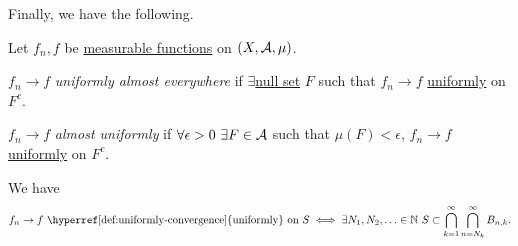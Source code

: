 Finally, we have the following.
\begin{definition*}
	Let \(f_{n}, f\) be \hyperref[def:measurable-function]{measurable functions} on \((X, \mathcal{\MakeUppercase{a}} , \mu )\).
	\begin{definition}\label{def:uniformly-almost-everywhere}
		\(f_{n}\to f\) \emph{uniformly almost everywhere} if \(\exists \)\hyperref[def:mu-null-set]{null set} \(F\) such that
		\(f_{n}\to f\) \hyperref[def:uniformly-convergence]{uniformly} on \(F^{c} \).
	\end{definition}
	\begin{definition}\label{def:almost-uniformly}
		\(f_{n}\to f\) \emph{almost uniformly} if \(\forall \epsilon >0\ \exists F\in \mathcal{\MakeUppercase{a}} \) such that
		\(\mu (F)<\epsilon \), \(f_{n}\to f\)  \hyperref[def:uniformly-convergence]{uniformly} on \(F^{c} \).
	\end{definition}
\end{definition*}

\begin{lemma}
	We have
	\[
		f_{n}\to f \text{ \hyperref[def:uniformly-convergence]{uniformly} on } S \iff \exists N_1, N_2, \ldots\in \mathbb{\MakeUppercase{n}}\ S\subset \bigcap\limits_{k=1}^{\infty} \bigcap\limits_{n=N_k}^{\infty} B_{n, k}.
	\]
\end{lemma}

